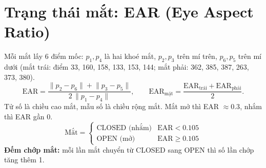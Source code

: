 \documentclass[12pt,a4paper]{article}
\begin{document}
\section{Trạng thái mắt: EAR (Eye Aspect Ratio)}
Mỗi mắt lấy 6 điểm mốc: $p_1, p_4$ là hai khoé mắt, $p_2, p_3$ trên mí trên, $p_6, p_5$ trên mí dưới (mắt trái: điểm 33, 160, 158, 133, 153, 144; mắt phải: 362, 385, 387, 263, 373, 380).
\[
\text{EAR}=\frac{\lVert p_2-p_6\rVert+\lVert p_3-p_5\rVert}{2\,\lVert p_1-p_4\rVert},
\qquad
\text{EAR}_{\text{mặt}}=\frac{\text{EAR}_{\text{trái}}+\text{EAR}_{\text{phải}}}{2}.
\]
Tử số là chiều cao mắt, mẫu số là chiều rộng mắt. Mắt mở thì EAR $\approx 0.3$, nhắm thì EAR gần $0$.
\[
\text{Mắt} =
\begin{cases}
\text{CLOSED (nhắm)} & \text{EAR} < 0.105\\
\text{OPEN (mở)} & \text{EAR} \ge 0.105
\end{cases}
\]
\textbf{Đếm chớp mắt:} mỗi lần mắt chuyển từ CLOSED sang OPEN thì số lần chớp tăng thêm 1.
\end{document}
